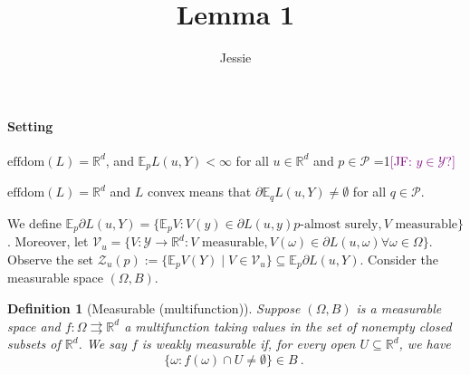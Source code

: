 \documentclass{article}
\title{Lemma 1}
\author{Jessie}
\newcommand{\Comments}{1}
\newcommand{\mynote}[2]{\ifnum\Comments=1\textcolor{#1}{#2}\fi}
\newcommand{\jessie}[1]{\mynote{purple}{[JF: #1]}}
\newcommand{\reals}{\mathbb{R}}
\newcommand{\effdom}{\mathrm{effdom}}
\newcommand{\B}{\mathcal{B}}
\newcommand{\E}{\mathbb{E}}
\renewcommand{\P}{\mathcal{P}}
\newcommand{\V}{\mathcal{V}}
\newcommand{\Y}{\mathcal{Y}}
\newcommand{\Z}{\mathcal{Z}}
\newcommand{\toto}{\rightrightarrows}
\newtheorem{definition}{Definition}
\begin{document}
\maketitle
\paragraph{Setting} 
$\effdom(L) = \reals^d$, and $\E_p L(u,Y) < \infty$ for all $u \in \reals^d$ and $p \in \P$ \jessie{$y \in \Y$?}

$\effdom(L) = \reals^d$ and $L$ convex means that $\partial \E_q L(u,Y) \neq \emptyset$ for all $q \in \P$.

We define $\E_p \partial L(u,Y) = \{\E_p V: V(y) \in \partial L(u,y) p\text{-almost surely}, V \text{ measurable}\}$.
Moreover, let $\V_{u} = \{V : \Y \to \reals^d : V \text{ measurable}, V(\omega) \in \partial L(u,\omega) \forall \omega \in \Omega\}$.
Observe the set $\Z_u(p) := \{\E_p V(Y) \mid V \in \V_u\} \subseteq \E_p \partial L(u,Y)$.
Consider the measurable space $(\Omega, B)$. 

\begin{definition}[Measurable (multifunction)]
	Suppose $(\Omega, B)$ is a measurable space and $f:\Omega \toto \reals^d$ a multifunction taking values in the set of nonempty closed subsets of $\reals^d$.
	We say $f$ is weakly measurable if, for every open $U \subseteq \reals^d$, we have
	\begin{equation*}
	\{\omega : f(\omega) \cap U \neq \emptyset\} \in B~.~
	\end{equation*}
\end{definition}
\end{document}
